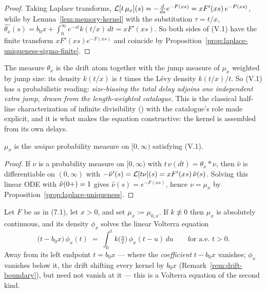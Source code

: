 \begin{proof}
Taking Laplace transforms, $\mathcal{L}[t\,\mu_x](s) = -\tfrac{d}{ds} e^{-F(xs)} = x F'(xs)\,
e^{-F(xs)}$, while by Lemma~\ref{lem:memory-kernel} with the substitution $\tau = t/x$,
$\widehat{\theta_x}(s) = b_0 x + \int_0^\infty e^{-st} k(t/x)\,dt = x F'(xs)$. So both sides
of (V.1) have the finite transform $x F'(xs)e^{-F(xs)}$ and coincide by
Proposition~\ref{prop:laplace-uniqueness-sigma-finite}.
\end{proof}

The measure $\theta_x$ is the drift atom together with the jump measure of $\mu_x$
weighted by jump size: its density $k(t/x)$ is $t$ times the Lévy density $k(t/x)/t$.
So (V.1) has a probabilistic reading: \emph{size-biasing the total delay adjoins one
independent extra jump, drawn from the length-weighted catalogue}. This is the classical
half-line characterization of infinite divisibility () with
the catalogue's role made explicit, and it is what makes the equation constructive: the
kernel is assembled from its own delays.

\begin{proposition}\label{prop:volterra-uniqueness}
$\mu_x$ is the \emph{unique} probability measure on $[0,\infty)$ satisfying (V.1).
\end{proposition}

\begin{proof}
If $\nu$ is a probability measure on $[0,\infty)$ with $t\,\nu(dt) = \theta_x * \nu$, then
$\hat\nu$ is differentiable on $(0,\infty)$ with
$-\hat\nu'(s) = \mathcal{L}[t\nu](s) = xF'(xs)\,\hat\nu(s)$. Solving this linear ODE with
$\hat\nu(0{+}) = 1$ gives $\hat\nu(s) = e^{-F(xs)}$, hence $\nu = \mu_x$ by
Proposition~\ref{prop:laplace-uniqueness}.
\end{proof}

\begin{proposition}\label{prop:volterra-density}
Let $F$ be as in (7.1), let $x > 0$, and set $\mu_x := \mu_{0,x}$. If $k \not\equiv 0$ then
$\mu_x$ is absolutely continuous, and its density $\phi_x$ solves the linear Volterra
equation
\[
  \bigl(t - b_0 x\bigr)\,\phi_x(t)
  \;=\; \int_0^t k\bigl(\tfrac{u}{x}\bigr)\,\phi_x(t - u)\,du
  \qquad \text{for a.e.\ } t > 0. \tag{V.2}
\]
Away from its left endpoint $t = b_0 x$ --- where the \emph{coefficient} $t - b_0 x$
vanishes; $\phi_x$ vanishes below it, the drift shifting every kernel by $b_0 x$
(Remark~\ref{rem:drift-boundary}), but need not vanish at it --- this is a Volterra equation
of the second kind.
\end{proposition}

